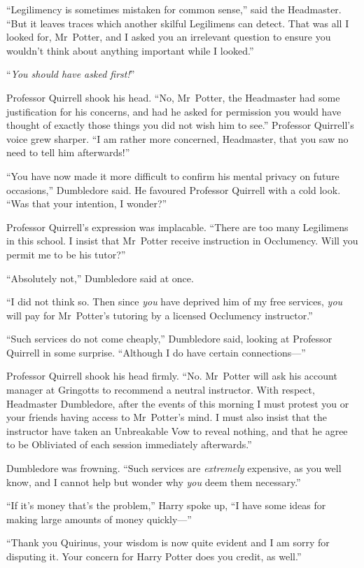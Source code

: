 “Legilimency is sometimes mistaken for common sense,” said the Headmaster. “But it leaves traces which another skilful Legilimens can detect. That was all I looked for, Mr~Potter, and I asked you an irrelevant question to ensure you wouldn’t think about anything important while I looked.”

“\emph{You should have asked first!}”

Professor Quirrell shook his head. “No, Mr~Potter, the Headmaster had some justification for his concerns, and had he asked for permission you would have thought of exactly those things you did not wish him to see.” Professor Quirrell’s voice grew sharper. “I am rather more concerned, Headmaster, that you saw no need to tell him afterwards!”

“You have now made it more difficult to confirm his mental privacy on future occasions,” Dumbledore said. He favoured Professor Quirrell with a cold look. “Was that your intention, I wonder?”

Professor Quirrell’s expression was implacable. “There are too many Legilimens in this school. I insist that Mr~Potter receive instruction in Occlumency. Will you permit me to be his tutor?”

“Absolutely not,” Dumbledore said at once.

“I did not think so. Then since \emph{you} have deprived him of my free services, \emph{you} will pay for Mr~Potter’s tutoring by a licensed Occlumency instructor.”

“Such services do not come cheaply,” Dumbledore said, looking at Professor Quirrell in some surprise. “Although I do have certain connections—”

Professor Quirrell shook his head firmly. “No. Mr~Potter will ask his account manager at Gringotts to recommend a neutral instructor. With respect, Headmaster Dumbledore, after the events of this morning I must protest you or your friends having access to Mr~Potter’s mind. I must also insist that the instructor have taken an Unbreakable Vow to reveal nothing, and that he agree to be Obliviated of each session immediately afterwards.”

Dumbledore was frowning. “Such services are \emph{extremely} expensive, as you well know, and I cannot help but wonder why \emph{you} deem them necessary.”

“If it’s money that’s the problem,” Harry spoke up, “I have some ideas for making large amounts of money quickly—”

“Thank you Quirinus, your wisdom is now quite evident and I am sorry for disputing it. Your concern for Harry Potter does you credit, as well.”

